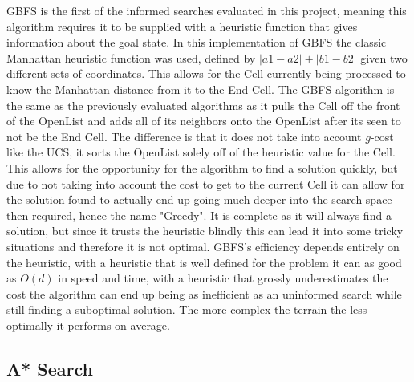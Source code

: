 \documentclass[conference]{IEEEtran}
\begin{document}
GBFS is the first of the informed searches evaluated in this project, meaning this algorithm requires it to be supplied with a heuristic function that gives information about the goal state. In this implementation of GBFS the classic Manhattan heuristic function was used, defined by $|a1 - a2| + |b1 - b2|$ given two different sets of coordinates. This allows for the Cell currently being processed to know the Manhattan distance from it to the End Cell. The GBFS algorithm is the same as the previously evaluated algorithms as it pulls the Cell off the front of the OpenList and adds all of its neighbors onto the OpenList after its seen to not be the End Cell. The difference is that it does not take into account $g$-cost like the UCS, it sorts the OpenList solely off of the heuristic value for the Cell. This allows for the opportunity for the algorithm to find a solution quickly, but due to not taking into account the cost to get to the current Cell it can allow for the solution found to actually end up going much deeper into the search space then required, hence the name "Greedy". It is complete as it will always find a solution, but since it trusts the heuristic blindly this can lead it into some tricky situations and therefore it is not optimal. GBFS's efficiency depends entirely on the heuristic, with a heuristic that is well defined for the problem it can as good as $O(d)$ in speed and time, with a heuristic that grossly underestimates the cost the algorithm can end up being as inefficient as an uninformed search while still finding a suboptimal solution. The more complex the terrain the less optimally it performs on average.

\subsection{A* Search}
\end{document}
